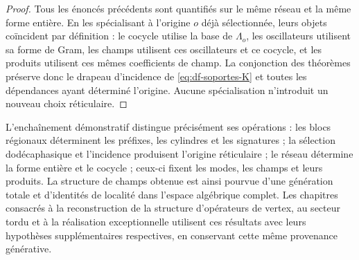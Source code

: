 \begin{proof}
Tous les énoncés précédents sont quantifiés sur le même réseau et la même forme entière. En les spécialisant à l’origine \(o\) déjà sélectionnée, leurs objets coïncident par définition : le cocycle utilise la base de \(\Lambda_o\), les oscillateurs utilisent sa forme de Gram, les champs utilisent ces oscillateurs et ce cocycle, et les produits utilisent ces mêmes coefficients de champ. La conjonction des théorèmes préserve donc le drapeau d’incidence de \eqref{eq:df-soportes-K} et toutes les dépendances ayant déterminé l’origine. Aucune spécialisation n’introduit un nouveau choix réticulaire.
\end{proof}

L’enchaînement démonstratif distingue précisément ses opérations : les blocs régionaux déterminent les préfixes, les cylindres et les signatures ; la sélection dodécaphasique et l’incidence produisent l’origine réticulaire ; le réseau détermine la forme entière et le cocycle ; ceux-ci fixent les modes, les champs et leurs produits. La structure de champs obtenue est ainsi pourvue d’une génération totale et d’identités de localité dans l’espace algébrique complet. Les chapitres consacrés à la reconstruction de la structure d’opérateurs de vertex, au secteur tordu et à la réalisation exceptionnelle utilisent ces résultats avec leurs hypothèses supplémentaires respectives, en conservant cette même provenance générative.
